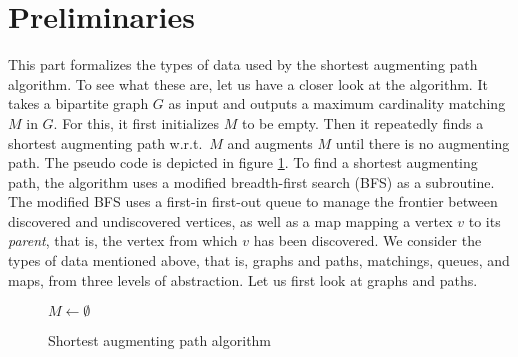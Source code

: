 \part{Preliminaries}
\label{ch:2}

This part formalizes the types of data used by the shortest augmenting path algorithm. To see what these are, let us have a closer look at the algorithm. It takes a bipartite graph $G$ as input and outputs a maximum cardinality matching $M$ in $G$. For this, it first initializes $M$ to be empty. Then it repeatedly finds a shortest augmenting path w.r.t.\ $M$ and augments $M$ until there is no augmenting path. The pseudo code is depicted in figure \ref{fig:1}. To find a shortest augmenting path, the algorithm uses a modified breadth-first search (BFS) as a subroutine. The modified BFS uses a first-in first-out queue to manage the frontier between discovered and undiscovered vertices, as well as a map mapping a vertex $v$ to its \emph{parent}, that is, the vertex from which $v$ has been discovered. We consider the types of data mentioned above, that is, graphs and paths, matchings, queues, and maps, from three levels of abstraction. Let us first look at graphs and paths.

\begin{figure}
    \centering
    \begin{algorithm}[H]
        \DontPrintSemicolon
        $M\gets\emptyset$\;
        \caption{}
    \end{algorithm}
    \label{fig:1}
    \caption{Shortest augmenting path algorithm}
\end{figure}